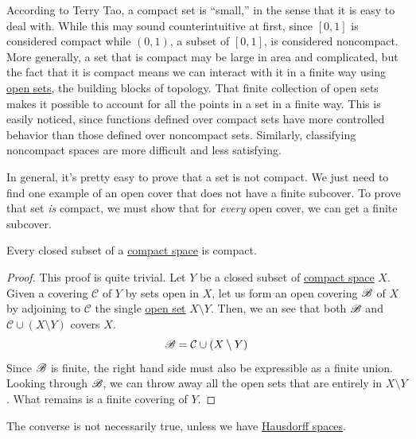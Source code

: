   According to Terry Tao, a compact set is ``small,'' in the sense that it is easy to deal with. While this may sound counterintuitive at first, since $[0,1]$ is considered compact while $(0,1)$, a subset of $[0,1]$, is considered noncompact. More generally, a set that is compact may be large in area and complicated, but the fact that it is compact means we can interact with it in a finite way using \hyperref[def:open-set]{open sets}, the building blocks of topology. That finite collection of open sets makes it possible to account for all the points in a set in a finite way. This is easily noticed, since functions defined over compact sets have more controlled behavior than those defined over noncompact sets. Similarly, classifying noncompact spaces are more difficult and less satisfying. 

  In general, it's pretty easy to prove that a set is not compact. We just need to find one example of an open cover that does not have a finite subcover. To prove that set \textit{is} compact, we must show that for \textit{every} open cover, we can get a finite subcover. 

  \begin{theorem}
    \label{thm:closed-subsets-of-compact-sets-are-compact}
    Every closed subset of a \hyperref[def:compact-space]{compact space} is compact. 
  \end{theorem}
  \begin{proof}
    This proof is quite trivial. Let $Y$ be a closed subset of \hyperref[def:compact-space]{compact space} $X$. Given a covering $\mathcal{C}$ of $Y$ by sets open in $X$, let us form an open covering $\operatorname{\mathscr{B}}$ of $X$ by adjoining to $\mathcal{C}$ the single \hyperref[def:open-set]{open set} $X \setminus Y$. Then, we an see that both $\operatorname{\mathscr{B}}$ and $\mathcal{C} \cup (X \setminus Y)$ covers $X$. 
    \begin{equation}
      \operatorname{\mathscr{B}} = \mathcal{C} \cup (X \setminus Y)
    \end{equation}
    Since $\operatorname{\mathscr{B}}$ is finite, the right hand side must also be expressible as a finite union. Looking through $\operatorname{\mathscr{B}}$, we can throw away all the open sets that are entirely in $X \setminus Y$. What remains is a finite covering of $Y$. 
  \end{proof}

  The converse is not necessarily true, unless we have \hyperref[def:hausdorff-space]{Hausdorff spaces}. 

